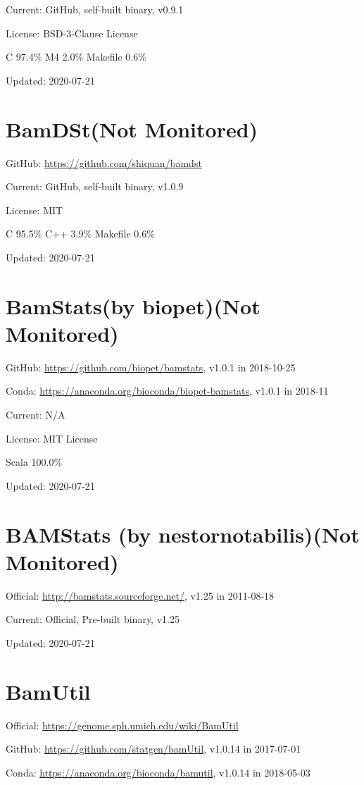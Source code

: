 \documentclass[]{article}
\newcommand{\nm}{{\color{red}(Not Monitored)}}
\begin{document}
Current: GitHub, self-built binary, v0.9.1

License: BSD-3-Clause License

C 97.4\% M4 2.0\% Makefile 0.6\%

Updated: 2020-07-21

\section{BamDSt\nm}

GitHub: \url{https://github.com/shiquan/bamdst}

Current: GitHub, self-built binary, v1.0.9

License: MIT

C 95.5\% C++ 3.9\% Makefile 0.6\%

Updated: 2020-07-21

\section{BamStats(by biopet)\nm}

GitHub: \url{https://github.com/biopet/bamstats}, v1.0.1 in 2018-10-25

Conda: \url{https://anaconda.org/bioconda/biopet-bamstats}, v1.0.1 in 2018-11

Current: N/A

License: MIT License

Scala 100.0\%

Updated: 2020-07-21

\section{BAMStats (by nestornotabilis)\nm}

Official: \url{http://bamstats.sourceforge.net/}, v1.25 in 2011-08-18

Current: Official, Pre-built binary, v1.25

Updated: 2020-07-21

\section{BamUtil}

Official: \url{https://genome.sph.umich.edu/wiki/BamUtil}

GitHub: \url{https://github.com/statgen/bamUtil}, v1.0.14 in 2017-07-01

Conda: \url{https://anaconda.org/bioconda/bamutil}, v1.0.14 in 2018-05-03
\end{document}
